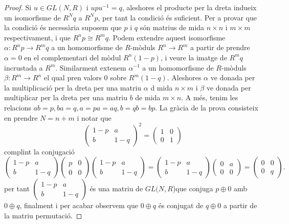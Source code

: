 \begin{proof}
Si $u\in GL(N,R)$ i $upu^{-1}=q$, aleshores el producte per la dreta indueix un isomorfisme de $R^Nq$ a $R^Np$, per tant la condició és suficient. Per a provar que la condició és necessària suposem que $p$ i $q$ són matrius de mida $n\times n$ i $m\times m$ respectivament, i que $R^np \cong R^mq$. Podem extendre aquest isomorfisme $\alpha : R^np\rightarrow R^mq$ a un homomorfisme de $R$-mòduls $R^n \rightarrow R^m$ a partir de prendre $\alpha =0$ en el complementari del mòdul $R^n(1-p)$, i veure la imatge de $R^mq$ incrustada a $R^m$. Similarment extenem $\alpha^{-1}$ a un homomorfisme de $R$-mòduls $\beta : R^m \rightarrow R^n$ el qual pren valors 0 sobre $R^m(1-q)$.
Aleshores $\alpha$ ve donada per la multiplicació per la dreta per una matriu $\alpha$ d mida $n\times m$ i $\beta$ ve donada per multiplicar per la dreta per una matriu $b$ de mida $m\times n$. A més, tenim les relacions $ab=p, ba=q, a=pa=aq, b=qb=bp$. La gràcia de la prova consisteix en prendre $N=n+m$ i notar que 
$$
\left( \begin{matrix}
  1-p & a \\
  b & 1-q
 \end{matrix} \right)^2
 =
 \left( \begin{matrix}
  1 & 0 \\
  0 & 1
 \end{matrix} \right)
$$
complint la conjugació
$$
\left( \begin{matrix}
  1-p & a \\
  b & 1-q
 \end{matrix} \right)
 \left( \begin{matrix}
  p & 0 \\
  0 & 0
 \end{matrix} \right)
 \left( \begin{matrix}
  1-p & a \\
  b & 1-q
 \end{matrix} \right)
 =
 \left( \begin{matrix}
  1-p & a \\
  b & 1-q
 \end{matrix} \right)
 \left( \begin{matrix}
  0 & a \\
  0 & 0
 \end{matrix} \right)
 =
  \left( \begin{matrix}
  0 & 0 \\
  0 & q
 \end{matrix} \right) .
$$
per tant $\left( \begin{matrix}
  1-p & a \\
  b & 1-q
 \end{matrix} \right)$ és una matriu de $GL(N,R$)que conjuga $p\oplus 0$ amb $0\oplus q$, finalment i per acabar observem que $0\oplus q$ és conjugat de $q\oplus 0$ a partir de la matriu permutació.
\end{proof}

